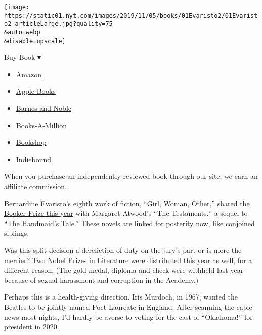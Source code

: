 \texttt{[image: https://static01.nyt.com/images/2019/11/05/books/01Evaristo2/01Evaristo2-articleLarge.jpg?quality=75\\\&auto=webp\\\&disable=upscale]}

Buy Book ▾

\begin{itemize}
\tightlist
\item
  \href{https://www.amazon.com/gp/search?index=books\&tag=NYTBSREV-20\&field-keywords=Girl\%2C+Woman\%2C+Other+Bernardine+Evaristo}{Amazon}
\item
  \href{https://du-gae-books-dot-nyt-du-prd.appspot.com/buy?title=Girl\%2C+Woman\%2C+Other\&author=Bernardine+Evaristo}{Apple
  Books}
\item
  \href{https://www.anrdoezrs.net/click-7990613-11819508?url=https\%3A\%2F\%2Fwww.barnesandnoble.com\%2Fw\%2F\%3Fean\%3D9780802156983}{Barnes
  and Noble}
\item
  \href{https://www.anrdoezrs.net/click-7990613-35140?url=https\%3A\%2F\%2Fwww.booksamillion.com\%2Fp\%2FGirl\%252C\%2BWoman\%252C\%2BOther\%2FBernardine\%2BEvaristo\%2F9780802156983}{Books-A-Million}
\item
  \href{https://bookshop.org/a/3546/9780802156983}{Bookshop}
\item
  \href{https://www.indiebound.org/book/9780802156983?aff=NYT}{Indiebound}
\end{itemize}

When you purchase an independently reviewed book through our site, we
earn an affiliate commission.

\href{https://www.nytimes.com/2019/11/01/books/bernardine-evaristo-girl-woman-other-booker-prize.html}{Bernardine
Evaristo}'s eighth work of fiction, ``Girl, Woman, Other,''
\href{https://www.nytimes.com/2019/10/14/books/booker-prize-winner-atwood-evaristo.html}{shared
the Booker Prize this year} with Margaret Atwood's ``The Testaments,'' a
sequel to ``The Handmaid's Tale.'' These novels are linked for posterity
now, like conjoined siblings.

Was this split decision a dereliction of duty on the jury's part or is
more the merrier?
\href{https://www.nytimes.com/2019/10/10/books/nobel-literature.html}{Two
Nobel Prizes in Literature were distributed this year} as well, for a
different reason. (The gold medal, diploma and check were withheld last
year because of sexual harassment and corruption in the Academy.)

Perhaps this is a health-giving direction. Iris Murdoch, in 1967, wanted
the Beatles to be jointly named Poet Laureate in England. After scanning
the cable news most nights, I'd hardly be averse to voting for the cast
of ``Oklahoma!'' for president in 2020.

